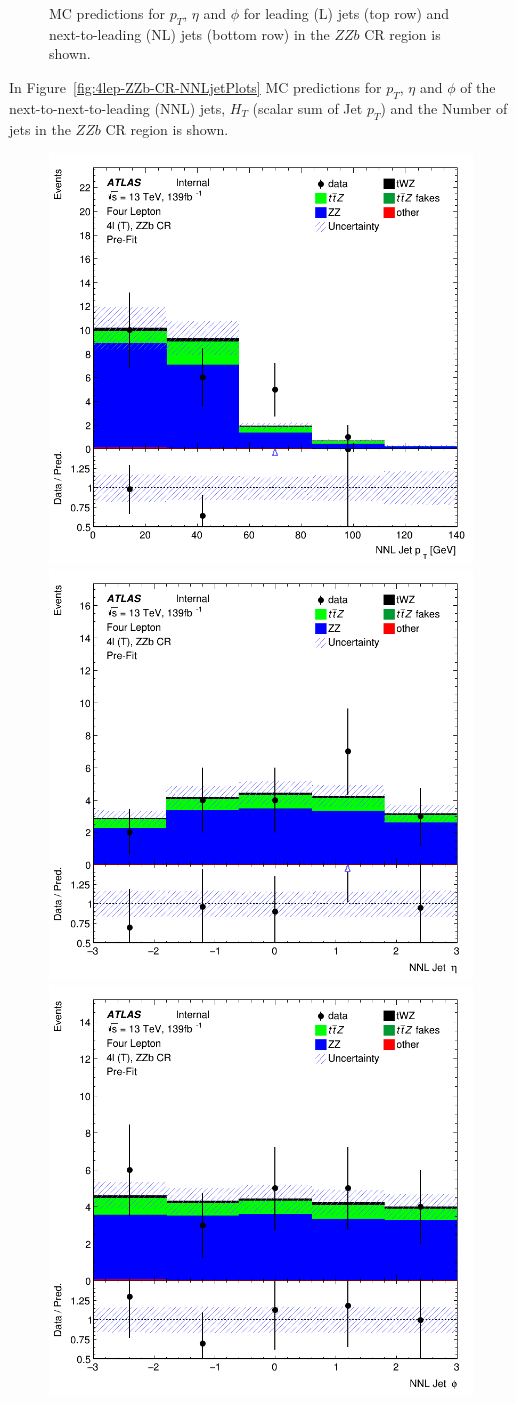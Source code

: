 \begin{figure}[htbp]
\begin{tabular}{ccc}
  \end{tabular}
    \caption{MC predictions for $p_{T}$, $\eta$ and $\phi$ for leading (L) jets (top row) and next-to-leading (NL) jets (bottom row) in the $ZZb$ CR region  is shown.}
    \label{fig:4lep-ZZb-CR-LandNjetPlots} 
\end{figure}

In Figure~\ref{fig:4lep-ZZb-CR-NNLjetPlots} MC predictions for $p_{T}$, $\eta$ and $\phi$ of the next-to-next-to-leading (NNL) jets, $H_{T}$ (scalar sum of Jet $p_{T}$) and the Number of jets in the $ZZb$ CR region is shown.


\begin{figure}[htbp]
 \centering


    \includegraphics[width=.3\textwidth]{figures/PreFitPlots/lep4_ZZb_4T_NNLJet_pt.png} \quad
    \includegraphics[width=.3\textwidth]{figures/PreFitPlots/lep4_ZZb_4T_NNLJet_eta.png} \quad
    \includegraphics[width=.3\textwidth]{figures/PreFitPlots/lep4_ZZb_4T_NNLJet_phi.png}

    \medskip


\end{figure}
